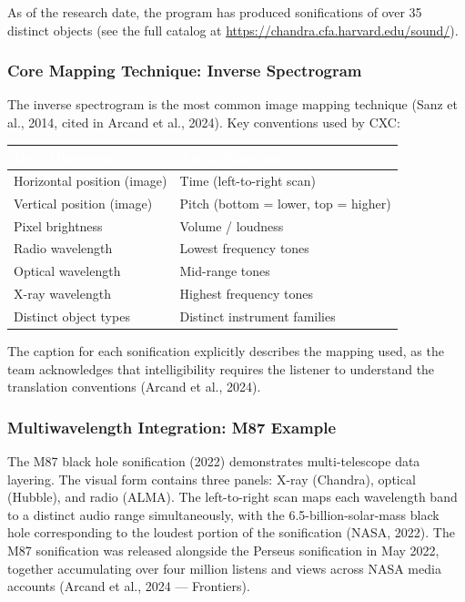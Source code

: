 \documentclass[11pt,letterpaper]{article}
\newcommand{\tableheader}[1]{\textbf{\sffamily\textcolor{white}{#1}}}
\begin{document}
As of the research date, the program has produced sonifications of over 35 distinct objects (see the full catalog at \url{https://chandra.cfa.harvard.edu/sound/}).

\subsubsection{Core Mapping Technique: Inverse Spectrogram}

The inverse spectrogram is the most common image mapping technique (Sanz et al., 2014, cited in Arcand et al., 2024). Key conventions used by CXC:

\begin{center}
\begin{tabularx}{\textwidth}{L{4cm}X}
\toprule
{}
\tableheader{Data Dimension} & \tableheader{Audio Mapping} \\
\midrule
Horizontal position (image) & Time (left-to-right scan) \\
Vertical position (image) & Pitch (bottom = lower, top = higher) \\
Pixel brightness & Volume / loudness \\
Radio wavelength & Lowest frequency tones \\
Optical wavelength & Mid-range tones \\
X-ray wavelength & Highest frequency tones \\
Distinct object types & Distinct instrument families \\
\bottomrule
\end{tabularx}
\end{center}

The caption for each sonification explicitly describes the mapping used, as the team acknowledges that intelligibility requires the listener to understand the translation conventions (Arcand et al., 2024).

\subsubsection{Multiwavelength Integration: M87 Example}

The M87 black hole sonification (2022) demonstrates multi-telescope data layering. The visual form contains three panels: X-ray (Chandra), optical (Hubble), and radio (ALMA). The left-to-right scan maps each wavelength band to a distinct audio range simultaneously, with the 6.5-billion-solar-mass black hole corresponding to the loudest portion of the sonification (NASA, 2022). The M87 sonification was released alongside the Perseus sonification in May 2022, together accumulating over four million listens and views across NASA media accounts (Arcand et al., 2024 — Frontiers).
\end{document}
